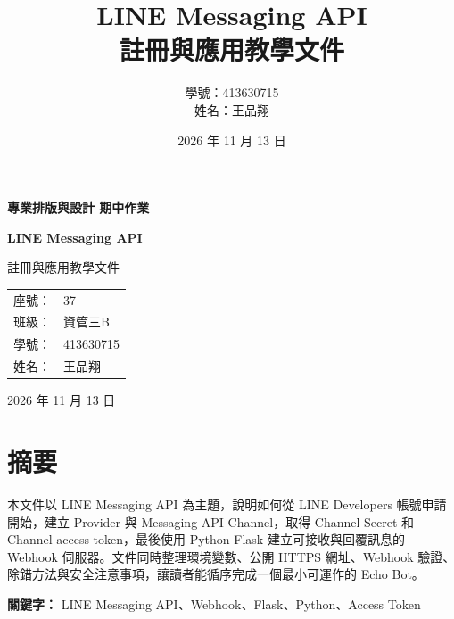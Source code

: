 \documentclass[a4paper,12pt]{report}
\title{LINE Messaging API\\註冊與應用教學文件}
\author{學號：413630715\\姓名：王品翔}
\date{2026 年 11 月 13 日}
\begin{document}
\begin{titlepage}
    \centering
    \vspace*{2cm}
    {\Huge\bfseries 專業排版與設計 期中作業\par}
    \vspace{1.5cm}
    {\LARGE\bfseries LINE Messaging API\par}
    \vspace{0.4cm}
    {\LARGE 註冊與應用教學文件\par}
    \vfill
    \begin{tabular}{rl}
        座號： & 37 \\ [0.5cm]
        班級： & 資管三B \\ [0.5cm]
        學號： & 413630715 \\ [0.5cm]
        姓名： & 王品翔 \\
    \end{tabular}
    \vfill
    {\large 2026 年 11 月 13 日\par}
\end{titlepage}

\chapter*{摘要}
本文件以 LINE Messaging API 為主題，說明如何從 LINE Developers 帳號申請開始，建立 Provider 與 Messaging API Channel，取得 Channel Secret 和 Channel access token，最後使用 Python Flask 建立可接收與回覆訊息的 Webhook 伺服器。文件同時整理環境變數、公開 HTTPS 網址、Webhook 驗證、除錯方法與安全注意事項，讓讀者能循序完成一個最小可運作的 Echo Bot。

\noindent\textbf{關鍵字：} LINE Messaging API、Webhook、Flask、Python、Access Token
\clearpage

\tableofcontents
\clearpage
\listoffigures
\clearpage
\listoftables
\clearpage
\lstlistoflistings
\clearpage






\end{document}
